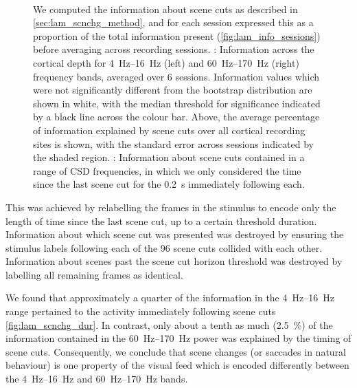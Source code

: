 \begin{figure}[htbp]
\centering
{}
\\
%
\caption{
We computed the information about scene cuts as described in \autoref{sec:lam_scnchg_method}, and for each session expressed this as a proportion of the total information present (\autoref{fig:lam_info_sessions}) before averaging across recording sessions.
\protect{}: Information across the cortical depth for \SIrange{4}{16}{Hz} (left) and \SIrange{60}{170}{Hz} (right) frequency bands, averaged over \num{6} sessions.
Information values which were not significantly different from the bootstrap distribution are shown in white, with the median threshold for significance indicated by a black line across the colour bar.
Above, the average percentage of information explained by scene cuts over all cortical recording sites is shown, with the standard error across sessions indicated by the shaded region.
\protect{}: Information about scene cuts contained in a range of \ac{CSD} frequencies, in which we only considered the time since the last scene cut for the \SI{0.2}{\second} immediately following each.
}%
\label{fig:lam_scnchg}
%
\end{figure}

This was achieved by relabelling the frames in the stimulus to encode only the length of time since the last scene cut, up to a certain threshold duration.
Information about which scene cut was presented was destroyed by ensuring the stimulus labels following each of the \num{96} scene cuts collided with each other.
Information about scenes past the scene cut horizon threshold was destroyed by labelling all remaining frames as identical.

We found that approximately a quarter of the information in the \SIrange{4}{16}{Hz} range pertained to the activity immediately following scene cuts \autoref{fig:lam_scnchg_dur}.
In contrast, only about a tenth as much (\SI{2.5}{\percent}) of the information contained in the \SIrange{60}{170}{Hz} power was explained by the timing of scene cuts.
Consequently, we conclude that scene changes (or saccades in natural behaviour) is one property of the visual feed which is encoded differently between the \SIrange{4}{16}{Hz} and \SIrange{60}{170}{Hz} bands.

